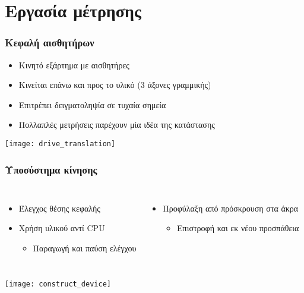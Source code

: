 \documentclass[xetex,mathserif,serif]{beamer}
\begin{document}
\section{Εργασία μέτρησης}

\begin{frame}\frametitle%
    {Κεφαλή αισθητήρων}

    \begin{itemize}
    \item Κινητό εξάρτημα με αισθητήρες
    \item Κινείται επάνω και προς το υλικό (3 άξονες γραμμικής)
    \item Επιτρέπει δειγματοληψία σε τυχαία σημεία
    \item Πολλαπλές μετρήσεις παρέχουν μία ιδέα της κατάστασης
    \end{itemize}

    \begin{center}
    \texttt{[image: drive\_translation]}
    \end{center}
\end{frame}


\begin{frame}\frametitle%
    {Υποσύστημα κίνησης}

    \begin{columns}
    \column{5.5cm}
    \begin{itemize}
        \item Έλεγχος θέσης κεφαλής
        \item Χρήση υλικού αντί CPU
        \begin{itemize}
            \item Παραγωγή και παύση ελέγχου
        \end{itemize}
    \end{itemize}

    \column{5.5cm}
    \begin{itemize}
        \item Προφύλαξη από πρόσκρουση στα άκρα
            \begin{itemize}
            \item Επιστροφή και εκ νέου προσπάθεια
            \end{itemize}
    \end{itemize}
    \end{columns}

    \begin{center}
    \texttt{[image: construct\_device]}
    \end{center}
\end{frame}
\end{document}
